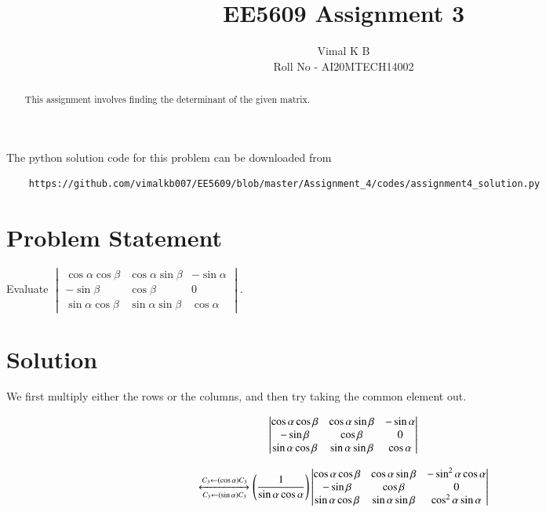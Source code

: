 \documentclass[journal,12pt,twocolumn]{IEEEtran}
\begin{document}
\title{EE5609 Assignment 3}
\author{Vimal K B \\Roll No - AI20MTECH14002}

\maketitle
\newpage
\bigskip

\renewcommand{\thefigure}{\theenumi}
\renewcommand{\thetable}{\theenumi}

\begin{abstract}
	This assignment involves finding the determinant of the given matrix.
\end{abstract}

The python solution code for this problem can be downloaded from

\begin{lstlisting}
	https://github.com/vimalkb007/EE5609/blob/master/Assignment_4/codes/assignment4_solution.py
\end{lstlisting}

\section{\textbf{Problem Statement}}
Evaluate 
$\begin{vmatrix}
	\cos\alpha \cos\beta &\cos\alpha \sin\beta &-\sin\alpha \\ 
	-\sin\beta & \cos\beta &0 \\ \sin\alpha\cos\beta&\sin\alpha\sin\beta&\cos\alpha
\end{vmatrix}.$\\
		
	
\section{\textbf{Solution}}

We first multiply either the rows or the columns, and then try taking the common element out.

\begin{align}
	\begin{vmatrix}
		\cos\alpha \cos\beta & \cos\alpha \sin\beta & -\sin\alpha \\ 
		-\sin\beta & \cos\beta & 0 \\ 
		\sin\alpha\cos\beta & \sin\alpha\sin\beta & \cos\alpha
	\end{vmatrix} \nonumber
\end{align}

\begin{align}\label{eq1}
	\xleftrightarrow[C_3 \leftarrow (\sin\alpha) C_3]{C_3 \leftarrow (\cos\alpha) C_3}
	\left(\frac{1}{\sin\alpha\cos\alpha}\right)
	\begin{vmatrix}
		\cos\alpha \cos\beta &\cos\alpha \sin\beta & -\sin^{2}\alpha \cos\alpha\\ 
		-\sin\beta & \cos\beta & 0 \\ 
		\sin\alpha\cos\beta & \sin\alpha\sin\beta & \cos^{2}\alpha\sin\alpha
	\end{vmatrix}	
\end{align}
\end{document}
